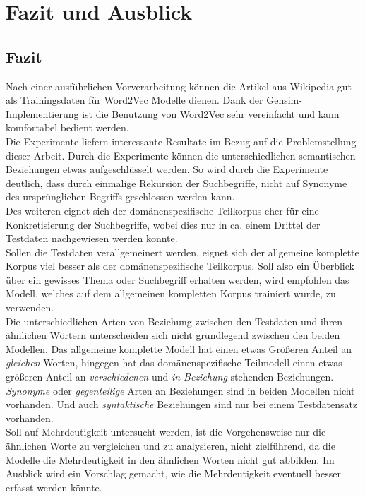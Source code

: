 \documentclass[12pt,a4paper]{report}
\begin{document}
\newpage
\chapter{Fazit und Ausblick}
\section{Fazit}
Nach einer ausführlichen Vorverarbeitung können die Artikel aus Wikipedia gut als Trainingsdaten für Word2Vec Modelle dienen. Dank der Gensim-Implementierung ist die Benutzung von Word2Vec sehr vereinfacht und kann komfortabel bedient werden.\\
Die Experimente liefern interessante Resultate im Bezug auf die Problemstellung dieser Arbeit. Durch die Experimente können die unterschiedlichen semantischen Beziehungen etwas aufgeschlüsselt werden.
So wird durch die Experimente deutlich, dass durch einmalige Rekursion der Suchbegriffe, nicht auf Synonyme des ursprünglichen Begriffs geschlossen werden kann.\\
Des weiteren eignet sich der domänenspezifische Teilkorpus eher für eine Konkretisierung der Suchbegriffe, wobei dies nur in ca. einem Drittel der Testdaten nachgewiesen werden konnte. \\
Sollen die Testdaten verallgemeinert werden, eignet sich der allgemeine komplette Korpus viel besser als der domänenspezifische Teilkorpus. Soll also ein Überblick über ein gewisses Thema oder Suchbegriff erhalten werden, wird empfohlen das Modell, welches auf dem allgemeinen kompletten Korpus trainiert wurde, zu verwenden.\\
Die unterschiedlichen Arten von Beziehung zwischen den Testdaten und ihren ähnlichen Wörtern unterscheiden sich nicht grundlegend zwischen den beiden Modellen. Das allgemeine komplette Modell hat einen etwas Größeren Anteil an \textit{gleichen} Worten, hingegen hat das domänenspezifische Teilmodell einen etwas größeren Anteil an \textit{verschiedenen} und \textit{in Beziehung} stehenden Beziehungen. \textit{Synonyme} oder \textit{gegenteilige} Arten an Beziehungen sind in beiden Modellen nicht vorhanden. Und auch \textit{syntaktische} Beziehungen sind nur bei einem Testdatensatz vorhanden.\\
Soll auf Mehrdeutigkeit untersucht werden, ist die Vorgehensweise nur die ähnlichen Worte zu vergleichen und zu analysieren, nicht zielführend, da die Modelle die Mehrdeutigkeit in den ähnlichen Worten nicht gut abbilden. Im Ausblick wird ein Vorschlag gemacht, wie die Mehrdeutigkeit eventuell besser erfasst werden könnte.\\
\end{document}
